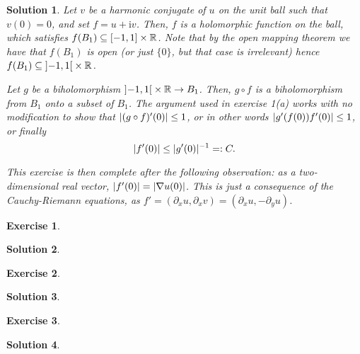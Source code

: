 \documentclass{article}
\newtheorem{ex}{Exercise}
\theoremstyle{nonumberplain}
\newtheorem{sol}{Solution}
\newcommand{\R}{\mathbb{R}}
\newcommand{\I}{\mathrm{i}}
\DeclarePairedDelimiter{\abs}{\lvert}{\rvert}
\begin{document}
\begin{sol}
Let $v$ be a harmonic conjugate of $u$ on the unit ball such that $v(0) = 0$, and set $f = u + \I v$. Then, $f$ is a holomorphic function on the ball, which satisfies $f(B_1) \subseteq \interval{-1}1 \times \R$. Note that by the open mapping theorem we have that $f(B_1)$ is open (or just $\{0\}$, but that case is irrelevant) hence $f(B_1) \subseteq \ointerval{-1}1 \times \R$.

Let $g$ be a biholomorphism $\ointerval{-1}1 \times \R \to B_1$. Then, $g \circ f$ is a biholomorphism from $B_1$ onto a subset of $B_1$. The argument used in exercise 1(a) works with no modification to show that $\abs{(g \circ f)'(0)} \leq 1$, or in other words $\abs{g'(f(0)) f'(0)} \leq 1$, or finally
\begin{equation}
\abs{f'(0)} \leq \abs{g'(0)}^{-1} =: C.
\end{equation}

This exercise is then complete after the following observation: as a two-dimensional real vector, $\abs{f'(0)} = \abs{\nabla u(0)}$. This is just a consequence of the Cauchy-Riemann equations, as $f' = (\partial_x u, \partial_x v) = (\partial_x u, - \partial_y u)$.
\end{sol}

\begin{ex}
\end{ex}

\begin{sol}

\end{sol}

\begin{ex}
\end{ex}

\begin{sol}

\end{sol}

\begin{ex}
\end{ex}

\begin{sol}

\end{sol}
\end{document}
